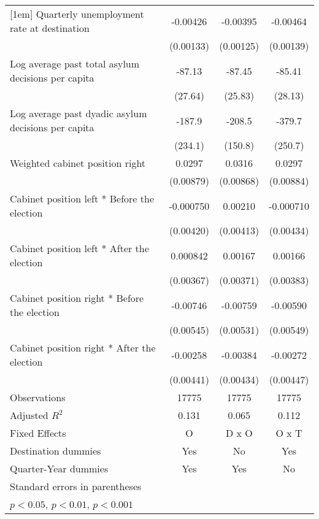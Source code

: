 \begin{table}[htbp]
\begin{tabular}{l*{3}{c}}
[1em]
Quarterly unemployment rate at destination&    -0.00426\sym{**} &    -0.00395\sym{**} &    -0.00464\sym{**} \\
                    &   (0.00133)         &   (0.00125)         &   (0.00139)         \\
[1em]
Log average past total asylum decisions per capita&      -87.13\sym{**} &      -87.45\sym{**} &      -85.41\sym{**} \\
                    &     (27.64)         &     (25.83)         &     (28.13)         \\
[1em]
Log average past dyadic asylum decisions per capita&      -187.9         &      -208.5         &      -379.7         \\
                    &     (234.1)         &     (150.8)         &     (250.7)         \\
[1em]
Weighted cabinet position right&      0.0297\sym{**} &      0.0316\sym{***}&      0.0297\sym{**} \\
                    &   (0.00879)         &   (0.00868)         &   (0.00884)         \\
[1em]
Cabinet position left * Before the election&   -0.000750         &     0.00210         &   -0.000710         \\
                    &   (0.00420)         &   (0.00413)         &   (0.00434)         \\
[1em]
Cabinet position left * After the election&    0.000842         &     0.00167         &     0.00166         \\
                    &   (0.00367)         &   (0.00371)         &   (0.00383)         \\
[1em]
Cabinet position right * Before the election&    -0.00746         &    -0.00759         &    -0.00590         \\
                    &   (0.00545)         &   (0.00531)         &   (0.00549)         \\
[1em]
Cabinet position right * After the election&    -0.00258         &    -0.00384         &    -0.00272         \\
                    &   (0.00441)         &   (0.00434)         &   (0.00447)         \\
\hline
Observations        &       17775         &       17775         &       17775         \\
Adjusted \(R^{2}\)  &       0.131         &       0.065         &       0.112         \\
Fixed Effects       &           O         &       D x O         &       O x T         \\
Destination dummies &         Yes         &          No         &         Yes         \\
Quarter-Year dummies&         Yes         &         Yes         &          No         \\
\hline\hline
\multicolumn{4}{l}{\footnotesize Standard errors in parentheses}\\
\multicolumn{4}{l}{\footnotesize \sym{*} \(p<0.05\), \sym{**} \(p<0.01\), \sym{***} \(p<0.001\)}\\
\end{tabular}
\end{table}
